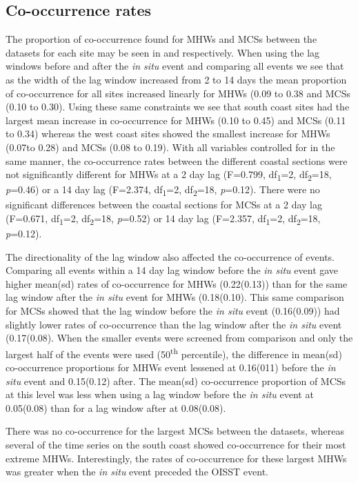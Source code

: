 \documentclass[a4paper,10pt,review]{elsarticle}
\begin{document}
\subsection{Co-occurrence rates}
The proportion of co-occurrence found for MHWs and MCSs between the datasets for each site may be seen in  and  respectively. When using the lag windows before and after the \emph{in situ} event and comparing all events we see that as the width of the lag window increased from 2 to 14 days the mean proportion of co-occurrence for all sites increased linearly for MHWs (0.09 to 0.38 and MCSs (0.10 to 0.30). Using these same constraints we see that south coast sites had the largest mean increase in co-occurrence for MHWs (0.10 to 0.45) and MCSs (0.11 to 0.34) whereas the west coast sites showed the smallest increase for MHWs (0.07to 0.28) and MCSs (0.08 to 0.19). With all variables controlled for in the same manner, the co-occurrence rates between the different coastal sections were not significantly different for MHWs at a 2 day lag (F=0.799, df\textsubscript{1}=2, df\textsubscript{2}=18, \emph{p}=0.46) or a 14 day lag (F=2.374, df\textsubscript{1}=2, df\textsubscript{2}=18, \emph{p}=0.12). There were no significant differences between the coastal sections for MCSs at a 2 day lag (F=0.671, df\textsubscript{1}=2, df\textsubscript{2}=18, \emph{p}=0.52) or 14 day lag (F=2.357, df\textsubscript{1}=2, df\textsubscript{2}=18, \emph{p}=0.12).

The directionality of the lag window also affected the co-occurrence of events. Comparing all events within a 14 day lag window before the \emph{in situ} event gave higher mean(sd) rates of co-occurrence for MHWs (0.22(0.13)) than for the same lag window after the \emph{in situ} event for MHWs (0.18(0.10). This same comparison for MCSs showed that the lag window before the \emph{in situ} event (0.16(0.09)) had slightly lower rates of co-occurrence than the lag window after the \emph{in situ} event (0.17(0.08). When the smaller events were screened from comparison and only the largest half of the events were used (50\textsuperscript{th} percentile), the difference in mean(sd) co-occurrence proportions for MHWs event lessened at 0.16(011) before the \emph{in situ} event and 0.15(0.12) after. The mean(sd) co-occurrence proportion of MCSs at this level was less when using a lag window before the \emph{in situ} event at 0.05(0.08) than for a lag window after at 0.08(0.08).

There was no co-occurrence for the largest MCSs between the datasets, whereas several of the time series on the south coast showed co-occurrence for their most extreme MHWs. Interestingly, the rates of co-occurrence for these largest MHWs was greater when the \emph{in situ} event preceded the OISST event.
\end{document}
